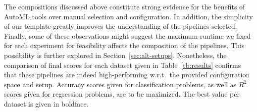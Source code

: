 The compositions discussed above constitute strong evidence for the benefits of AutoML tools over manual selection and configuration. In addition, the simplicity of our template greatly improves the understanding of the pipelines selected. Finally, some of these observations might suggest the maximum runtime we fixed for each experiment for feasibility affects the composition of the pipelines. This possibility is further explored in Section~\ref{sec:alt-setups}. Nonetheless, the comparison of final scores for each dataset given in Table~\ref{tb:results} confirms that these pipelines are indeed high-performing w.r.t.~the provided configuration space and setup. Accuracy scores given for classification problems, as well as $R^2$ scores given for regression problems, are to be maximized. The best value per dataset is given in boldface. 


